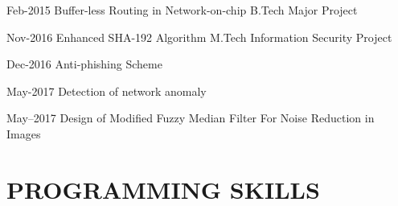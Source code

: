 \documentclass[]{cv-style}          %
\begin{document}
\begin{entrylist}
\entry
{Feb-2015}
{Buffer-less Routing in Network-on-chip }
{B.Tech Major Project}
{\vspace{-0.3cm}}

\end{entrylist}
%
\begin{entrylist}
\entry
{Nov-2016}
{Enhanced SHA-192 Algorithm}
{M.Tech Information Security Project}
{\vspace{-0.3cm}}
\end{entrylist}
\begin{entrylist}
\entry
{Dec-2016}
{Anti-phishing Scheme }
{}
{\vspace{-0.3cm}}
%
\end{entrylist}
%
\begin{entrylist}
\entry
{May-2017}
{Detection of network anomaly}
{}
{\vspace{-0.3cm}}


\end{entrylist}
%
\begin{entrylist}
\entry
{May--2017}
{Design of Modified Fuzzy Median Filter For Noise Reduction in Images }
{}
{\vspace{-0.3cm}}

\end{entrylist}
%

\section{PROGRAMMING SKILLS}
\end{document}
